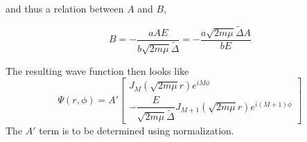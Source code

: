and thus a relation between $A$ and $B$,

\begin{equation}
  B = -\dfrac{aAE}{b\sqrt{2m\mu}\tilde\Delta} = -\dfrac{a\sqrt{2m\mu}\tilde\Delta A}{bE}
\end{equation}

The resulting wave function then looks like
\begin{equation}
  \Psi(r,\phi) = A'
  \begin{bmatrix}
    J_M(\sqrt{2m\mu}r) e^{iM\phi} \\
    -\dfrac{E}{\sqrt{2m\mu}\tilde\Delta} J_{M+1}(\sqrt{2m\mu}r) e^{i(M+1)\phi}
  \end{bmatrix}
\end{equation}
The $A'$ term is to be determined using normalization.
